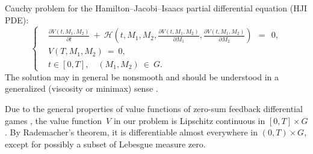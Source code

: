 \documentclass[a4paper,12pt]{article}
\begin{document}
Cauchy problem for the Hamilton--Jacobi--Isaacs partial differential equation (HJI PDE):
\begin{equation}
\left\{ \begin{aligned}
& \frac{\partial V(t, M_1, M_2)}{\partial t} \: + \: \mathcal{H} \left( t, M_1, M_2,
\frac{\partial V(t, M_1, M_2)}{\partial M_1}, \frac{\partial V(t, M_1, M_2)}{\partial M_2} \right) \:\: = \:\: 0, \\
& V(T, M_1, M_2) \: = \: 0, \\
& t \in [0, T], \quad (M_1, M_2) \: \in \: G.
\end{aligned} \right.  \label{15}
\end{equation}
The solution may in general be nonsmooth and should be understood in a generalized (viscosity or minimax) sense
\cite{FlemingSoner2006,Subbotin1995}.

Due to the general properties of value functions of zero-sum feedback differential games \cite{BotkinHoffmannTurova2011},
the value function~$ V $ in our problem is Lipschitz continuous in $ [0, T] \times G $. By Rademacher's theorem, it is
differentiable almost everywhere in $ (0, T) \times G $, except for possibly a subset of Lebesgue measure zero.
\end{document}
